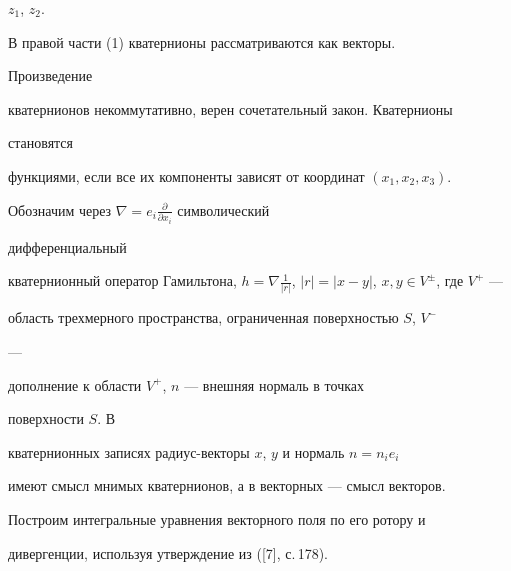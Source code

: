 $z_1$, $z_2$. 


В правой части (1) кватернионы рассматриваются как векторы. 


Произведение 


кватернионов некоммутативно, верен сочетательный закон. Кватернионы 


становятся  


функциями, если все их компоненты зависят от координат $(x_1,x_2,x_3)$. 


 


Обозначим через $\nabla=e_i\frac{\partial}{\partial x_i}$ символический   


дифференциальный 


кватернионный оператор Гамильтона, $h=\nabla\frac{1}{|r|}$, $|r|=|x-


y|$, $x,y\in V^\pm$, где $V^+$ --- 


область трехмерного пространства, ограниченная поверхностью $S$, $V^-$ 


--- 


дополнение к области $V^+$, $n$ --- внешняя нормаль в точках


поверхности $S$. В  


кватернионных записях радиус-векторы $x$, $y$ и нормаль $n=n_i e_i$ 


имеют смысл мнимых кватернионов, а в векторных --- смысл векторов. 


 


Построим интегральные уравнения векторного поля по его ротору и  


дивергенции, используя утверждение из ([7], с.\,178). 


 


